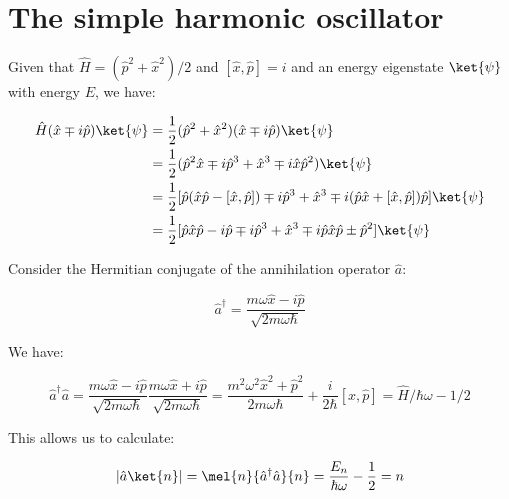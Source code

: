 \documentclass[12pt]{article}
\begin{document}



\pagebreak
\section*{The simple harmonic oscillator}


Given that $\hat{H} = (\hat{p}^2 + \hat{x}^2)/2$ and $[\hat{x}, \hat{p}] = i$ and an energy eigenstate $\ket{\psi}$ with energy $E$, we have:

\begin{equation}
\begin{split}
    \hat{H} (\hat{x} \mp i \hat{p}) \ket{\psi} &= \frac{1}{2} (\hat{p}^2 + \hat{x}^2) (\hat{x} \mp i \hat{p}) \ket{\psi} \\
    &= \frac{1}{2} (\hat{p}^2 \hat{x} \mp i \hat{p}^3 + \hat{x}^3 \mp i \hat{x} \hat{p}^2) \ket{\psi} \\
    &= \frac{1}{2} [\hat{p} (\hat{x} \hat{p} - [\hat{x}, \hat{p}]) \mp i \hat{p}^3 + \hat{x}^3 \mp i (\hat{p} \hat{x} + [\hat{x}, \hat{p}]) \hat{p}] \ket{\psi} \\
    &= \frac{1}{2} [\hat{p} \hat{x} \hat{p} - i\hat{p} \mp i \hat{p}^3 + \hat{x}^3 \mp i \hat{p} \hat{x} \hat{p} \pm  \hat{p}^2] \ket{\psi} \\
\end{split}
\end{equation}


Consider the Hermitian conjugate of the annihilation operator $\hat{a}$:

\begin{equation}
\hat{a}^{\dagger} = \frac{m\omega \hat{x} - i \hat{p}}{\sqrt{2m\omega \hbar}}
\end{equation}

We have:

\begin{equation}
    \hat{a}^{\dagger} \hat{a} = \frac{m\omega \hat{x} - i \hat{p}}{\sqrt{2m\omega \hbar}} \frac{m\omega \hat{x} + i \hat{p}}{\sqrt{2m\omega \hbar}} = \frac{m^2 \omega^2 \hat{x}^2 + \hat{p}^2}{2m\omega \hbar} + \frac{i}{2\hbar} [\hat{x}, \hat{p}] = \hat{H}/\hbar \omega - 1/2
\end{equation}

This allows us to calculate:

\begin{equation}
    \left\lvert \hat{a}\ket{n} \right\rvert = \mel{n}{\hat{a}^{\dagger} \hat{a}}{n} = \frac{E_{n}}{\hbar \omega} - \frac{1}{2} = n
\end{equation}
\end{document}
